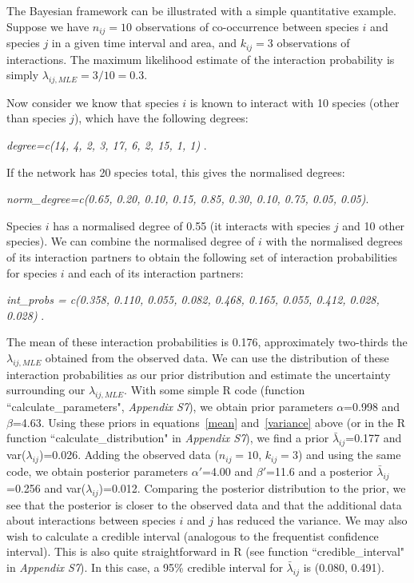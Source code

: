 \documentclass[12pt]{article}
\begin{document}
      The Bayesian framework can be illustrated with a simple quantitative example. Suppose we have $n_{ij}=10$ observations of co-occurrence between species $i$ and species $j$ in a given time interval and area, and $k_{ij}=3$ observations of interactions. The maximum likelihood estimate of the interaction probability is simply $\lambda_{ij,MLE} = 3/10 = 0.3$. 
      

      Now consider we know that species $i$ is known to interact with 10 species (other than species $j$), which have the following degrees:

        \vspace{12pt}
        \noindent\emph{
          degree=c(14, 4, 2, 3, 17, 6, 2, 15, 1, 1)
            }.
          \vspace{12pt}

        If the network has 20 species total, this gives the normalised degrees:

        \vspace{12pt}
        \noindent\emph{
          norm\_degree=c(0.65, 0.20, 0.10, 0.15, 0.85, 0.30, 0.10, 0.75, 0.05, 0.05)}.
          \vspace{12pt}

        Species $i$ has a normalised degree of 0.55 (it interacts with species $j$ and 10 other species). We can combine the normalised degree of $i$ with the normalised degrees of its interaction partners to obtain the following set of interaction probabilities for species $i$ and each of its interaction partners:

        \vspace{12pt}
        \noindent\emph{
           int\_probs = c(0.358, 0.110, 0.055, 0.082, 0.468, 0.165, 0.055, 0.412, 0.028, 0.028) }.
          \vspace{12pt}

        The mean of these interaction probabilities is 0.176, approximately two-thirds the $\lambda_{ij,MLE}$ obtained from the observed data. We can use the distribution of these interaction probabilities as our prior distribution and estimate the uncertainty surrounding our $\lambda_{ij,MLE}$. With some simple R code (function ``calculate\_parameters", \emph{Appendix S7}), we obtain prior parameters $\alpha$=0.998 and $\beta$=4.63. Using these priors in equations~\ref{mean} and~\ref{variance} above (or in the R function ``calculate\_distribution" in \emph{Appendix S7}), we find a prior $\bar\lambda_{ij}$=0.177 and var($\lambda_{ij}$)=0.026. Adding the observed data ($n_{ij}=10$, $k_{ij}=3$) and using the same code, we obtain posterior parameters $\alpha'$=4.00 and $\beta'$=11.6 and a posterior $\bar\lambda_{ij}$=0.256 and var($\lambda_{ij}$)=0.012. Comparing the posterior distribution to the prior, we see that the posterior is closer to the observed data and that the additional data about interactions between species $i$ and $j$ has reduced the variance. We may also wish to calculate a credible interval (analogous to the frequentist confidence interval). This is also quite straightforward in R (see function ``credible\_interval" in \emph{Appendix S7}). In this case, a 95\% credible interval for $\bar\lambda_{ij}$ is (0.080, 0.491).
\end{document}
